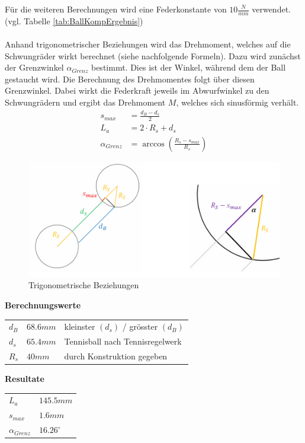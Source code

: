 Für die weiteren Berechnungen wird eine Federkonstante von $10 \frac{N}{mm}$ 
verwendet. (vgl. Tabelle \ref{tab:BallKompErgebnis})\\
\\
Anhand trigonometrischer Beziehungen wird das Drehmoment, welches auf die 
Schwungräder wirkt berechnet (siehe nachfolgende Formeln). Dazu wird zunächst 
der Grenzwinkel $\alpha_{Grenz}$ bestimmt. Dies ist der Winkel, während dem der Ball 
gestaucht wird. Die Berechnung des Drehmomentes folgt über diesen Grenzwinkel. 
Dabei wirkt die Federkraft jeweils im Abwurfwinkel zu den Schwungrädern und 
ergibt das Drehmoment $M$, welches sich sinusförmig verhält. 
%
\begin{align}  
    s_{max} &= \frac{d_B - d_s}{2}\\
    L_a &= 2 \cdot R_s + d_s\\
    \alpha_{Grenz} &= \arccos\left(\frac{R_s - s_{max}}{R_s}\right)
\end{align}

\begin{figure}[h!]
    \centering
    \includegraphics[width=1\textwidth]{Enddokumentation/Anhang/Bilder/TrigoBeziehungen.jpg}
    \caption{Trigonometrische Beziehungen}
    \label{fig:trigoBeziehungen}
\end{figure}
\textbf{Berechnungswerte}\\
\begin{tabular}{lll}
    \rule{0pt}{11pt} $d_B$ & $68.6 mm$ & kleinster $(d_s)$ / grösster $(d_B)$ \\
    \rule{0pt}{11pt} $d_s$ & $65.4 mm$ & Tennisball nach Tennisregelwerk \\
    \rule{0pt}{11pt} $R_s$ & $40 mm$ & durch Konstruktion gegeben \\
\end{tabular}

\textbf{Resultate}\\
\begin{tabular}{ll}
    \rule{0pt}{11pt} $L_a$ & $145.5 mm$ \\
    \rule{0pt}{11pt} $s_{max}$ & $1.6 mm$ \\
    \rule{0pt}{11pt} $\alpha_{Grenz}$ & $16.26^\circ$ \\
\end{tabular}

